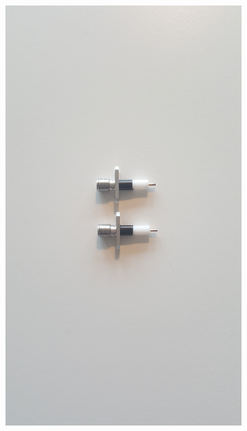 \documentclass[main.tex]{subfiles}
\begin{document}
\begin{figure}[h]
    \begin{subfigure}{0.329\textwidth}
        \centering
        \includegraphics[angle=-90,trim=1450 100 1550 100,clip,width=0.97\linewidth]{figure/Filterbilder/f_sma_skalning.jpg} 
        \caption{}
        \label{fig:f_SMA_skalning}
    \end{subfigure}
        \begin{subfigure}{0.329\textwidth}
        \centering

\end{subfigure}
\end{figure}
\end{document}
